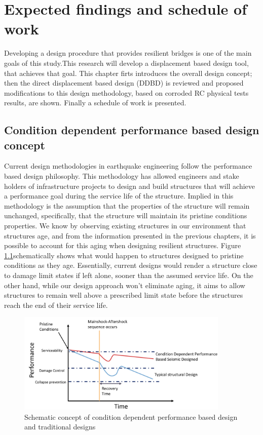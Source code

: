 \chapter{Expected findings and schedule of work}
Developing a design procedure that provides resilient bridges is one of the main goals of this study.This research will develop a displacement based design tool, that achieves that goal. This chapter firts introduces the overall design concept; then the direct displacement based design (DDBD) is reviewed and proposed modifications to this design methodology, based on corroded RC physical tests results, are shown. Finally a schedule of work is presented.

\section{Condition dependent performance based design concept}

Current design methodologies in earthquake engineering follow the performance based design philosophy. This methodology has allowed engineers and stake holders of infrastructure projects to design and build structures that will achieve a performance goal during the service life of the structure. Implied in this methodology is the assumption that the properties of the structure will remain unchanged, specifically, that the structure will maintain its pristine conditions properties. We know by observing existing structures in our environment that structures age, and from the information presented in the previous chapters, it is possible to account for this aging when designing resilient structures.  Figure \ref{fig:Concept_CD-DDBD}schematically shows what would happen to structures designed to pristine conditions as they age. Essentially, current designs would render a structure close to damage limit states if left alone, sooner than the assumed service life. On the other hand, while our design approach won’t eliminate aging, it aims to allow structures to remain well above a prescribed limit state before the structures reach the end of their service life. 

\begin{figure}[htbp]
	\centering
	\includegraphics[width=0.90\textwidth]{VAC Prelim 2.0/Chapter-5/figs/CD_DDBD_Concept.png}
	\caption{Schematic concept of condition dependent performance based design and traditional designs}
	\label{fig:Concept_CD-DDBD}
\end{figure}

